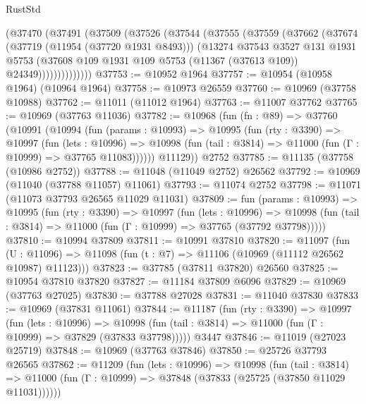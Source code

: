 \begin{lexlean}{RustStd}
\begin{coremodule}
          (@37470
            (@37491
              (@37509
                (@37526
                  (@37544
                    (@37555
                      (@37559
                        (@37662
                          (@37674
                            (@37719 (@11954 (@37720 @1931 @8493)))
                            (@13274
                              @37543
                              @3527
                              @131
                              @1931
                              @5753
                              (@37608
                                @109
                                @1931
                                @109
                                @5753
                                (@11367 (@37613 @109))
                                @24349))))))))))))))
@37753 := @10952 @1964
@37757 := @10954 (@10958 @1964) (@10964 @1964)
@37758 := @10973 @26559
@37760 := @10969 (@37758 @10988)
@37762 := @11011 (@11012 @1964)
@37763 := @11007 @37762
@37765 := @10969 (@37763 @11036)
@37782 := @10968
    (fun (fn : @89) =>
    @37760
      (@10991
        (@10994
          (fun (params : @10993) =>
          @10995
            (fun (rty : @3390) =>
            @10997
              (fun (lets : @10996) =>
              @10998 (fun (tail : @3814) => @11000 (fun (Γ : @10999) => @37765 @11083))))))
        @11129))
    @2752
@37785 := @11135 (@37758 (@10986 @2752))
@37788 := @11048 (@11049 @2752) @26562
@37792 := @10969 (@11040 (@37788 @11057) @11061)
@37793 := @11074 @2752
@37798 := @11071 (@11073 @37793 @26565 @11029 @11031)
@37809 := fun (params : @10993) =>
  @10995
    (fun (rty : @3390) =>
    @10997
      (fun (lets : @10996) =>
      @10998 (fun (tail : @3814) => @11000 (fun (Γ : @10999) => @37765 (@37792 @37798)))))
@37810 := @10994 @37809
@37811 := @10991 @37810
@37820 := @11097
    (fun (U : @11096) => @11098 (fun (t : @7) => @11106 (@10969 (@11112 @26562 @10987) @11123)))
@37823 := @37785 (@37811 @37820) @26560
@37825 := @10954 @37810 @37820
@37827 := @11184 @37809 @6096
@37829 := @10969 (@37763 @27025)
@37830 := @37788 @27028
@37831 := @11040 @37830
@37833 := @10969 (@37831 @11061)
@37844 := @11187
    (fun (rty : @3390) =>
    @10997
      (fun (lets : @10996) =>
      @10998 (fun (tail : @3814) => @11000 (fun (Γ : @10999) => @37829 (@37833 @37798)))))
    @3447
@37846 := @11019 (@27023 @25719)
@37848 := @10969 (@37763 @37846)
@37850 := @25726 @37793 @26565
@37862 := @11209
    (fun (lets : @10996) =>
    @10998
      (fun (tail : @3814) =>
      @11000 (fun (Γ : @10999) => @37848 (@37833 (@25725 (@37850 @11029 @11031))))))

\end{coremodule}
\end{lexlean}
